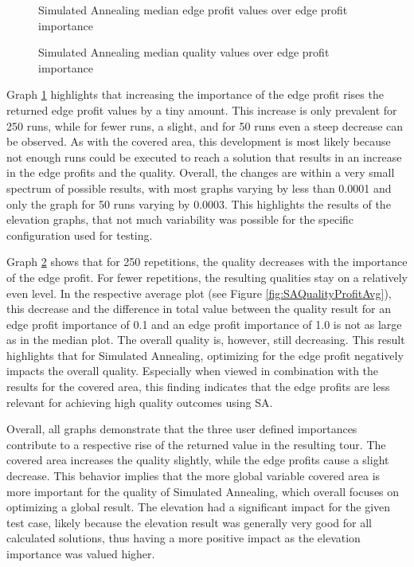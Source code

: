 \begin{figure}
	\centering
	
	\caption{Simulated Annealing median edge profit values over edge profit importance}
	\label{fig:SAProfitMed}
\end{figure}


\begin{figure}
	\centering
	
	\caption{Simulated Annealing median quality values over edge profit importance}
	\label{fig:SAQualityProfitMed}
\end{figure}




Graph \ref{fig:SAProfitMed} highlights that increasing the importance of the edge profit rises the returned edge profit values by a tiny amount. 
This increase is only prevalent for 250 runs, while for fewer runs, a slight, and for 50 runs even a steep decrease can be observed. 
As with the covered area, this development is most likely because not enough runs could be executed to reach a solution that results in an increase in the edge profits and the quality.
Overall, the changes are within a very small spectrum of possible results, with most graphs varying by less than 0.0001 and only the graph for 50 runs varying by 0.0003.
This highlights the results of the elevation graphs, that not much variability was possible for the specific configuration used for testing.


Graph \ref{fig:SAQualityProfitMed} shows that for 250 repetitions, the quality decreases with the importance of the edge profit.
For fewer repetitions, the resulting qualities stay on a relatively even level.
In the respective average plot (see Figure \ref{fig:SAQualityProfitAvg}), this decrease and the difference in total value between the quality result for an edge profit importance of 0.1 and an edge profit importance of 1.0 is not as large as in the median plot.
The overall quality is, however, still decreasing.
This result highlights that for Simulated Annealing, optimizing for the edge profit negatively impacts the overall quality. 
Especially when viewed in combination with the results for the covered area, this finding indicates that the edge profits are less relevant for achieving high quality outcomes using SA.



Overall, all graphs demonstrate that the three user defined importances contribute to a respective rise of the returned value in the resulting tour.
The covered area increases the quality slightly, while the edge profits cause a slight decrease.
This behavior implies that the more global variable covered area is more important for the quality of Simulated Annealing, which overall focuses on optimizing a global result.
The elevation had a significant impact for the given test case, likely because the elevation result was generally very good for all calculated solutions, thus having a more positive impact as the elevation importance was valued higher.





